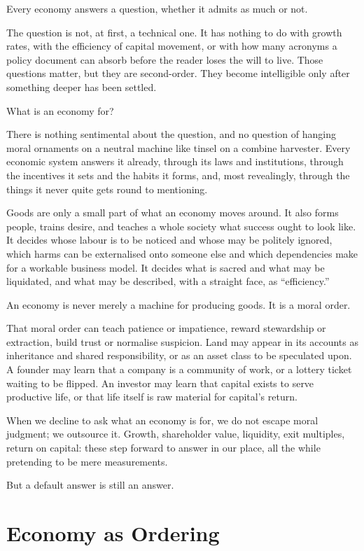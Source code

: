 \documentclass[11pt,a4paper,oneside]{book}
\begin{document}
Every economy answers a question, whether it admits as much or not.

The question is not, at first, a technical one. It has nothing to do with growth rates, with the efficiency of capital movement, or with how many acronyms a policy document can absorb before the reader loses the will to live. Those questions matter, but they are second-order. They become intelligible only after something deeper has been settled.

What is an economy for?

There is nothing sentimental about the question, and no question of hanging moral ornaments on a neutral machine like tinsel on a combine harvester. Every economic system answers it already, through its laws and institutions, through the incentives it sets and the habits it forms, and, most revealingly, through the things it never quite gets round to mentioning.

Goods are only a small part of what an economy moves around. It also forms people, trains desire, and teaches a whole society what success ought to look like. It decides whose labour is to be noticed and whose may be politely ignored, which harms can be externalised onto someone else and which dependencies make for a workable business model. It decides what is sacred and what may be liquidated, and what may be described, with a straight face, as ``efficiency.''

An economy is never merely a machine for producing goods. It is a moral order.

That moral order can teach patience or impatience, reward stewardship or extraction, build trust or normalise suspicion. Land may appear in its accounts as inheritance and shared responsibility, or as an asset class to be speculated upon. A founder may learn that a company is a community of work, or a lottery ticket waiting to be flipped. An investor may learn that capital exists to serve productive life, or that life itself is raw material for capital's return.

When we decline to ask what an economy is for, we do not escape moral judgment; we outsource it. Growth, shareholder value, liquidity, exit multiples, return on capital: these step forward to answer in our place, all the while pretending to be mere measurements.

But a default answer is still an answer.

\section*{Economy as Ordering}
\end{document}
